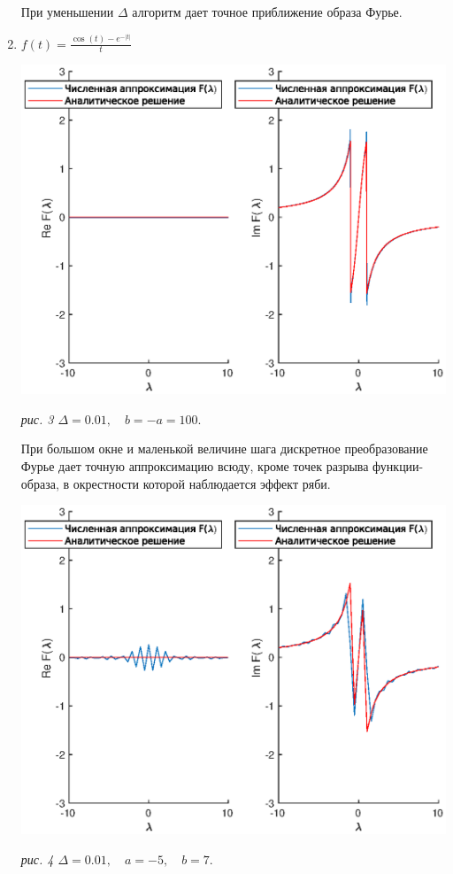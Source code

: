 \documentclass[11pt]{article}
\begin{document}
\begin{enumerate}
При уменьшении $\Delta$ алгоритм дает точное приближение образа Фурье. 

\newpage
\item $f\left(t\right) = \frac{\cos\left(t\right)-e^{-\lvert t\rvert}}{t}$

\includegraphics[width=1.0\textwidth]{gr2_1.eps}
\begin{center}
\it{рис. 3 \quad $\Delta = 0.01, \quad b = -a = 100.$}
\end{center}

При большом окне и маленькой величине шага дискретное преобразование Фурье дает точную 
аппроксимацию всюду, кроме точек разрыва функции-образа, в окрестности которой наблюдается эффект ряби.

\includegraphics[width=1.0\textwidth]{gr2_2.eps}
\begin{center}
\it{рис. 4 \quad $\Delta = 0.01, \quad a = -5, \quad b = 7.$}
\end{center}


\end{enumerate}
\end{document}
